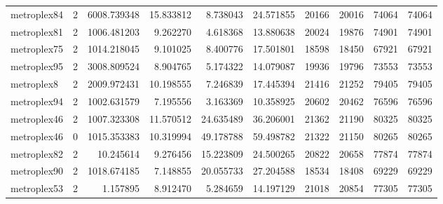 \begin{longtable}{|l|r|r|r|r|r|r|r|r|r|}
metroplex84 & 2 & 6008.739348 & 15.833812 & 8.738043 & 24.571855 & 20166 & 20016 & 74064 & 74064 \\
metroplex81 & 2 & 1006.481203 & 9.262270 & 4.618368 & 13.880638 & 20024 & 19876 & 74901 & 74901 \\
metroplex75 & 2 & 1014.218045 & 9.101025 & 8.400776 & 17.501801 & 18598 & 18450 & 67921 & 67921 \\
metroplex95 & 2 & 3008.809524 & 8.904765 & 5.174322 & 14.079087 & 19936 & 19796 & 73553 & 73553 \\
metroplex8 & 2 & 2009.972431 & 10.198555 & 7.246839 & 17.445394 & 21416 & 21252 & 79405 & 79405 \\
metroplex94 & 2 & 1002.631579 & 7.195556 & 3.163369 & 10.358925 & 20602 & 20462 & 76596 & 76596 \\
metroplex46 & 2 & 1007.323308 & 11.570512 & 24.635489 & 36.206001 & 21362 & 21190 & 80325 & 80325 \\
metroplex46 & 0 & 1015.353383 & 10.319994 & 49.178788 & 59.498782 & 21322 & 21150 & 80265 & 80265 \\
metroplex82 & 2 & 10.245614 & 9.276456 & 15.223809 & 24.500265 & 20822 & 20658 & 77874 & 77874 \\
metroplex90 & 2 & 1018.674185 & 7.148855 & 20.055733 & 27.204588 & 18534 & 18408 & 69229 & 69229 \\
metroplex53 & 2 & 1.157895 & 8.912470 & 5.284659 & 14.197129 & 21018 & 20854 & 77305 & 77305 \\
\end{longtable}
